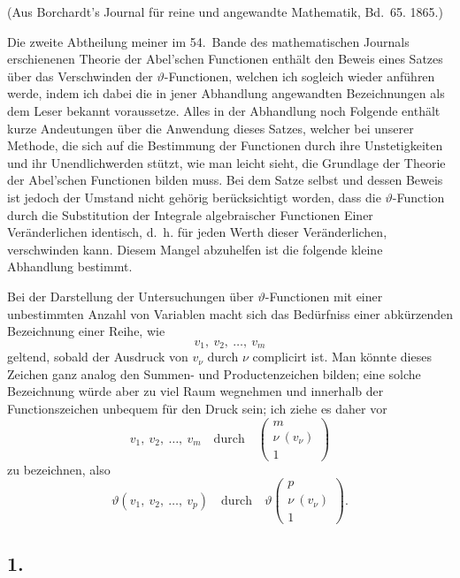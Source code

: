 \documentclass[12pt,a4paper]{book}
\theoremstyle{definition}
\theoremstyle{remark}
\begin{document}
\begin{center}
(Aus Borchardt's Journal für reine und angewandte Mathematik, Bd.~65. 1865.)
\end{center}

Die zweite Abtheilung meiner im 54.~Bande des mathematischen Journals erschienenen Theorie der Abel'schen Functionen enthält den Beweis eines Satzes über das Verschwinden der $\vartheta$-Functionen, welchen ich sogleich wieder anführen werde, indem ich dabei die in jener Abhandlung angewandten Bezeichnungen als dem Leser bekannt voraussetze. Alles in der Abhandlung noch Folgende enthält kurze Andeutungen über die Anwendung dieses Satzes, welcher bei unserer Methode, die sich auf die Bestimmung der Functionen durch ihre Unstetigkeiten und ihr Unendlichwerden stützt, wie man leicht sieht, die Grundlage der Theorie der Abel'schen Functionen bilden muss. Bei dem Satze selbst und dessen Beweis ist jedoch der Umstand nicht gehörig berücksichtigt worden, dass die $\vartheta$-Function durch die Substitution der Integrale algebraischer Functionen Einer Veränderlichen identisch, d.~h. für jeden Werth dieser Veränderlichen, verschwinden kann. Diesem Mangel abzuhelfen ist die folgende kleine Abhandlung bestimmt.

Bei der Darstellung der Untersuchungen über $\vartheta$-Functionen mit einer unbestimmten Anzahl von Variablen macht sich das Bedürfniss einer abkürzenden Bezeichnung einer Reihe, wie
\[ v_1,\ v_2,\ \ldots,\ v_m \]
geltend, sobald der Ausdruck von $v_\nu$ durch $\nu$ complicirt ist. Man könnte dieses Zeichen ganz analog den Summen- und Productenzeichen bilden; eine solche Bezeichnung würde aber zu viel Raum wegnehmen und innerhalb der Functionszeichen unbequem für den Druck sein; ich ziehe es daher vor
\[ v_1,\ v_2,\ \ldots,\ v_m \quad\text{durch}\quad \left(\begin{array}{c} m\\ \nu\ (v_\nu)\\ 1 \end{array}\right) \]
zu bezeichnen, also
\[ \vartheta(v_1,\ v_2,\ \ldots,\ v_p) \quad\text{durch}\quad \vartheta\left(\begin{array}{c} p\\ \nu\ (v_\nu)\\ 1 \end{array}\right). \]

\subsection*{1.}
\end{document}
